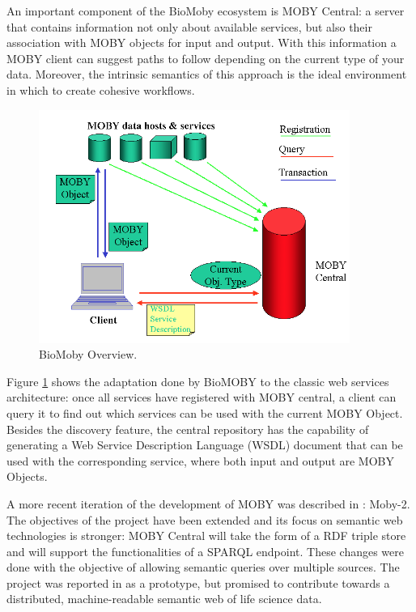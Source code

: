An important component of the BioMoby ecosystem is MOBY Central: a server that contains information not only about available services, but also their association with MOBY objects for input and output. With this information a MOBY client can suggest paths to follow depending on the current type of your data. Moreover, the intrinsic semantics of this approach is the ideal environment in which to create cohesive workflows.

\begin{figure}  
\centering
\includegraphics[width=4in]{figures/MOBY_Overview.png}
\caption[BioMoby Overview.]{BioMoby Overview.
\label{fig:biomoby}}
\end{figure}

Figure \ref{fig:biomoby} shows the adaptation done by BioMOBY to the classic web services architecture: once all services have registered with MOBY central, a client can query it to find out which services can be used with the current MOBY Object. Besides the discovery feature, the central repository has the capability of generating a Web Service Description Language (WSDL) document that can be used with the corresponding service, where both input and output are MOBY Objects.

A more recent iteration of the development of MOBY was described in \cite{VAN2009}: Moby-2. The objectives of the project have been extended and its focus on semantic web technologies is stronger: MOBY Central will take the form of a RDF triple store and will support the functionalities of a SPARQL endpoint. These changes were done with the objective of allowing semantic queries over multiple sources. The project was reported in \cite{VAN2009} as a prototype, but promised to contribute towards a distributed, machine-readable semantic web of life science data.


